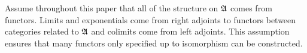\documentclass[csh.tex]{subfiles}
\begin{document}
\begin{remark} Assume throughout this paper that all of the structure on $\mathfrak A$ comes from functors. Limits and exponentials come from right adjoints to functors between categories related to $\mathfrak A$ and colimits come from left adjoints. This assumption ensures that many functors only specified up to isomorphism can be constructed.
\end{remark}
\end{document}
